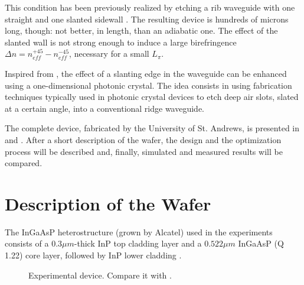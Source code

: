 This condition has been previously realized by etching a rib waveguide
with one straight and one slanted sidewall \cite{elrefaei_slanted}
\cite{elrefaei_optimized}. The resulting device is hundreds of microns
long, though: not better, in length, than an adiabatic one. The effect
of the slanted wall is not strong enough to induce a large
birefringence $\Delta n = n_{eff}^{+45} - n_{eff}^{-45}$, necessary
for a small $L_\pi$.

Inspired from \cite{cai_ultra}, the effect of a slanting edge
in the waveguide can be enhanced using a one-dimensional photonic
crystal. The idea consists in using fabrication techniques typically
used in photonic crystal devices to etch deep air slots, slated at a
certain angle, into a conventional ridge waveguide.

The complete device, fabricated by the University of St. Andrews, is
presented in \cite{kotlyar_compact} and
\cite{bolla_funfox_losanna}. After a short description of the wafer,
the design and the optimization process will be described and,
finally, simulated and measured results will be compared.

\section{Description of the Wafer}

The InGaAsP heterostructure (grown by Alcatel) used in the experiments
consists of a $0.3 \mu m$-thick InP top cladding layer and a $0.522
\mu m$ InGaAsP (Q 1.22) core layer, followed by InP lower cladding
.

\begin{figure}[htbp]
  \begin{center}
  \end{center}
  \caption{Experimental device. Compare it with
  .}
  \label{fig:polrot_experimental_device}
\end{figure}

